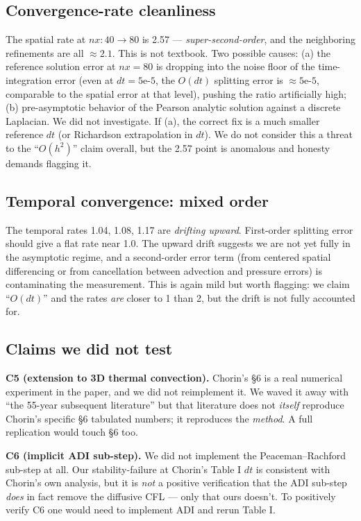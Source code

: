 \documentclass[11pt]{article}
\begin{document}
\subsection{Convergence-rate cleanliness}

The spatial rate at $nx: 40 \to 80$ is 2.57 --- \emph{super-second-order}, and the neighboring refinements are all $\approx 2.1$. This is not textbook. Two possible causes: (a) the reference solution error at $nx = 80$ is dropping into the noise floor of the time-integration error (even at $dt = 5\text{e-}5$, the $O(dt)$ splitting error is $\approx 5\text{e-}5$, comparable to the spatial error at that level), pushing the ratio artificially high; (b) pre-asymptotic behavior of the Pearson analytic solution against a discrete Laplacian. We did not investigate. If (a), the correct fix is a much smaller reference $dt$ (or Richardson extrapolation in $dt$). We do not consider this a threat to the ``$O(h^2)$'' claim overall, but the 2.57 point is anomalous and honesty demands flagging it.

\subsection{Temporal convergence: mixed order}

The temporal rates 1.04, 1.08, 1.17 are \emph{drifting upward}. First-order splitting error should give a flat rate near 1.0. The upward drift suggests we are not yet fully in the asymptotic regime, and a second-order error term (from centered spatial differencing or from cancellation between advection and pressure errors) is contaminating the measurement. This is again mild but worth flagging: we claim ``$O(dt)$'' and the rates \emph{are} closer to 1 than 2, but the drift is not fully accounted for.

\subsection{Claims we did not test}

\textbf{C5 (extension to 3D thermal convection).} Chorin's \S 6 is a real numerical experiment in the paper, and we did not reimplement it. We waved it away with ``the 55-year subsequent literature'' but that literature does not \emph{itself} reproduce Chorin's specific §6 tabulated numbers; it reproduces the \emph{method}. A full replication would touch §6 too.

\textbf{C6 (implicit ADI sub-step).} We did not implement the Peaceman--Rachford sub-step at all. Our stability-failure at Chorin's Table I $dt$ is consistent with Chorin's own analysis, but it is \emph{not} a positive verification that the ADI sub-step \emph{does} in fact remove the diffusive CFL --- only that ours doesn't. To positively verify C6 one would need to implement ADI and rerun Table I.
\end{document}
